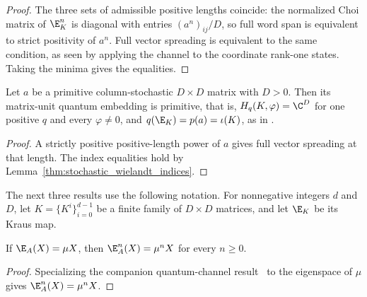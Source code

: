 \begin{proof}\leanok
    The three sets of admissible positive lengths coincide:
    the normalized Choi matrix of $\E_K^n$ is diagonal with entries
    $(a^n)_{ij}/D$, so full word span is equivalent to strict positivity
    of $a^n$. Full vector spreading is equivalent to the same condition,
    as seen by applying the channel to the coordinate rank-one states.
    Taking the minima gives the equalities.
\end{proof}

\begin{lemma}
    \label{thm:primitive_stochastic_embedding}
    \leanok
    Let $a$ be a primitive column-stochastic $D\times D$ matrix with
    $D>0$. Then its matrix-unit quantum embedding is primitive, that is,
    $H_q(K,\varphi)=\C^D$ for one positive $q$ and every $\varphi\neq0$, and
    $q(\E_K)=p(a)=\iota(K)$, as in
    \cite[Proposition~2]{Sanz2010Quantum}.
\end{lemma}

\begin{proof}\leanok
    A strictly positive positive-length power of $a$ gives full vector
    spreading at that length. The index equalities hold by
    Lemma~\ref{thm:stochastic_wielandt_indices}.
\end{proof}

The next three results use the following notation. For nonnegative integers
$d$ and $D$, let $K=\{K^i\}_{i=0}^{d-1}$ be a finite family of $D\times D$
matrices, and let $\E_K$ be its Kraus map.


\begin{lemma}
    \label{thm:transfer-map-eigenmatrix-power}
    \leanok
    If $\E_A(X)=\mu X$, then $\E_A^n(X)=\mu^nX$ for every $n\geq0$.
\end{lemma}

\begin{proof}\leanok
    Specializing the companion quantum-channel result~\cite[``Powers on an eigenspace'']{QICLean2026Blueprint}
    to the eigenspace of $\mu$ gives $\E_A^n(X)=\mu^nX$.
\end{proof}


